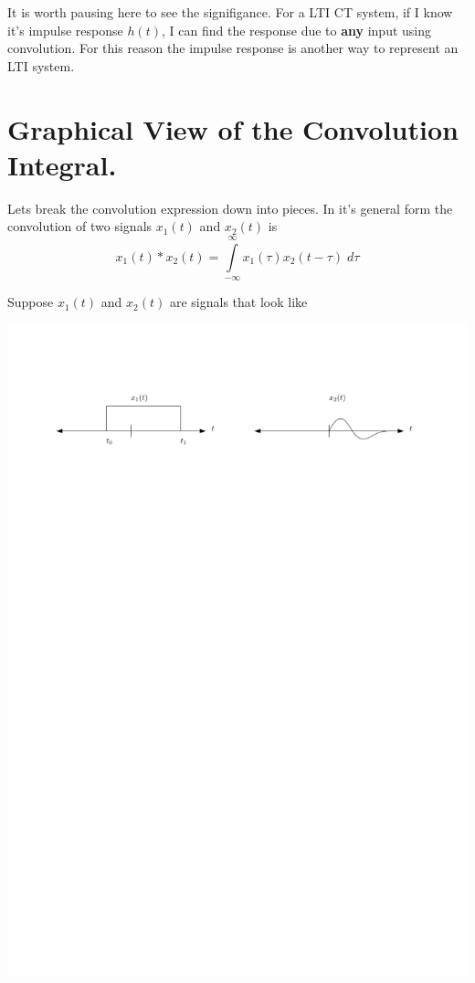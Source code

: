 It is worth pausing here to see the signifigance. For a LTI CT system, if I know it's impulse response $h(t)$, I can find the response due to \textbf{any} input using convolution. For this reason the impulse response is another way to represent an LTI system.

\section{Graphical View of the Convolution Integral.}

Lets break the convolution expression down into pieces. In it's general form the convolution of two signals $x_1(t)$ and $x_2(t)$ is
\[
x_1(t) * x_2(t) = \int\limits_{-\infty}^{\infty} x_1(\tau)x_2(t-\tau) \; d\tau
\]

Suppose $x_1(t)$ and $x_2(t)$ are signals that look like
\begin{center}
  \includegraphics[scale=1]{graphics/convolution-explain1.pdf}
\end{center}

